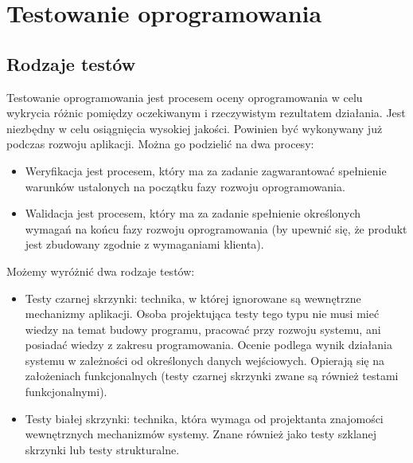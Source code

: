 
\chapter{Testowanie oprogramowania} %

\label{Chapter1} %



\section{Rodzaje testów}
Testowanie oprogramowania jest procesem oceny oprogramowania w celu wykrycia różnic pomiędzy oczekiwanym i rzeczywistym rezultatem działania. Jest niezbędny w celu osiągnięcia wysokiej jakości. Powinien być wykonywany już podczas rozwoju aplikacji. Można go podzielić na dwa procesy:

\begin{itemize}
\item Weryfikacja jest procesem, który ma za zadanie zagwarantować spełnienie warunków ustalonych na początku fazy rozwoju oprogramowania.

\item Walidacja jest procesem, który ma za zadanie spełnienie określonych wymagań na końcu fazy rozwoju oprogramowania (by upewnić się, że produkt jest zbudowany zgodnie z wymaganiami klienta).
\end{itemize}

Możemy wyróżnić dwa rodzaje testów:

\begin{itemize}
\item Testy czarnej skrzynki: technika, w której ignorowane są wewnętrzne mechanizmy aplikacji. Osoba projektująca testy tego typu nie musi mieć wiedzy na temat budowy programu, pracować przy rozwoju systemu, ani posiadać wiedzy z zakresu programowania. Ocenie podlega wynik działania systemu w zależności od określonych danych wejściowych. Opierają się na założeniach funkcjonalnych (testy czarnej skrzynki zwane  są również testami funkcjonalnymi).
\item Testy białej skrzynki: technika, która wymaga od projektanta znajomości wewnętrznych mechanizmów systemy. Znane również jako testy szklanej skrzynki lub testy strukturalne. 
\end{itemize}

